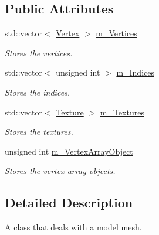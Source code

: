\subsection*{Public Attributes}
\begin{DoxyCompactItemize}
\item 
\mbox{\label{class_mesh_a49d22a483336417e41a7943f733b9c5e}} 
std\+::vector$<$ \mbox{\hyperlink{struct_vertex}{Vertex}} $>$ \mbox{\hyperlink{class_mesh_a49d22a483336417e41a7943f733b9c5e}{m\+\_\+\+Vertices}}
\begin{DoxyCompactList}\small\item\em Stores the vertices. \end{DoxyCompactList}\item 
\mbox{\label{class_mesh_a9bde92cfa4f0cf17859494a8e2012eff}} 
std\+::vector$<$ unsigned int $>$ \mbox{\hyperlink{class_mesh_a9bde92cfa4f0cf17859494a8e2012eff}{m\+\_\+\+Indices}}
\begin{DoxyCompactList}\small\item\em Stores the indices. \end{DoxyCompactList}\item 
\mbox{\label{class_mesh_aa60b78edeaf5dc1189cb3ffad0131b72}} 
std\+::vector$<$ \mbox{\hyperlink{struct_texture}{Texture}} $>$ \mbox{\hyperlink{class_mesh_aa60b78edeaf5dc1189cb3ffad0131b72}{m\+\_\+\+Textures}}
\begin{DoxyCompactList}\small\item\em Stores the textures. \end{DoxyCompactList}\item 
\mbox{\label{class_mesh_a15b7a86ef4dfa1616ff8c9ca734fb6f5}} 
unsigned int \mbox{\hyperlink{class_mesh_a15b7a86ef4dfa1616ff8c9ca734fb6f5}{m\+\_\+\+Vertex\+Array\+Object}}
\begin{DoxyCompactList}\small\item\em Stores the vertex array objects. \end{DoxyCompactList}\end{DoxyCompactItemize}


\subsection{Detailed Description}
A class that deals with a model mesh. 

